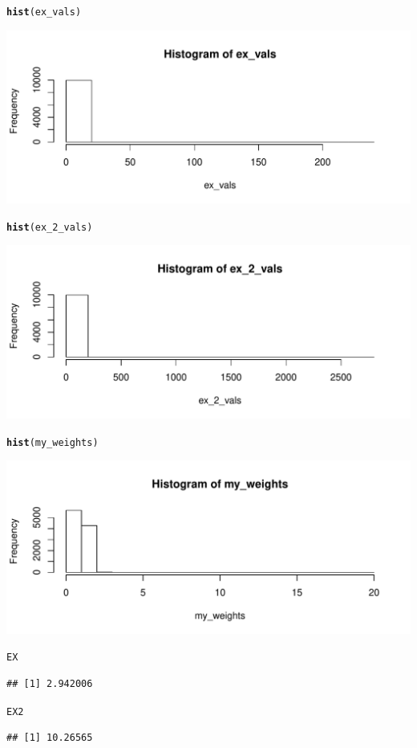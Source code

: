 \documentclass{article}\usepackage[]{graphicx}\usepackage[]{color}
\makeatletter
\def\maxwidth{ %
  \ifdim\Gin@nat@width>\linewidth
    \linewidth
  \else
    \Gin@nat@width
  \fi
}
\newcommand{\hlstd}[1]{\textcolor[rgb]{0.345,0.345,0.345}{#1}}%
\newcommand{\hlkwd}[1]{\textcolor[rgb]{0.737,0.353,0.396}{\textbf{#1}}}%
\newenvironment{kframe}{%
 \def\at@end@of@kframe{}%
 \ifinner\ifhmode%
  \def\at@end@of@kframe{\end{minipage}}%
  \begin{minipage}{\columnwidth}%
 \fi\fi%
 \def\FrameCommand##1{\hskip\@totalleftmargin \hskip-\fboxsep
 \colorbox{shadecolor}{##1}\hskip-\fboxsep
     \hskip-\linewidth \hskip-\@totalleftmargin \hskip\columnwidth}%
 \MakeFramed {\advance\hsize-\width
   \@totalleftmargin\z@ \linewidth\hsize
   \@setminipage}}%
 {\par\unskip\endMakeFramed%
 \at@end@of@kframe}
\newenvironment{knitrout}{}{} %
\makeatother
\begin{document}
\begin{knitrout}
\begin{kframe}
\begin{alltt}
\hlkwd{hist}\hlstd{(ex_vals)}
\end{alltt}
\end{kframe}
\includegraphics[width=\maxwidth]{figure/unnamed-chunk-3-1} 
\begin{kframe}\begin{alltt}
\hlkwd{hist}\hlstd{(ex_2_vals)}
\end{alltt}
\end{kframe}
\includegraphics[width=\maxwidth]{figure/unnamed-chunk-3-2} 
\begin{kframe}\begin{alltt}
\hlkwd{hist}\hlstd{(my_weights)}
\end{alltt}
\end{kframe}
\includegraphics[width=\maxwidth]{figure/unnamed-chunk-3-3} 
\begin{kframe}\begin{alltt}
\hlstd{EX}
\end{alltt}
\begin{verbatim}
## [1] 2.942006
\end{verbatim}
\begin{alltt}
\hlstd{EX2}
\end{alltt}
\begin{verbatim}
## [1] 10.26565
\end{verbatim}
\end{kframe}
\end{knitrout}
\end{document}
